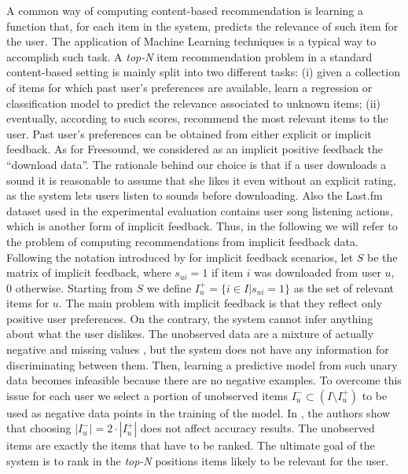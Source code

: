 A common way of computing content-based recommendation is learning a function that, for each item in the system, predicts the relevance of such item for the user. 
The application of Machine Learning techniques is a typical way to accomplish such task. %
A \textit{top-N}\xspace item recommendation problem in a standard content-based setting is mainly split into two different tasks: 
(i) given a collection of items for which past user's preferences are available, learn a regression or classification model to predict the relevance associated to unknown items; (ii) eventually, according to such scores, recommend the most relevant items to the user. 
Past user's preferences can be obtained from either explicit or implicit feedback. As for Freesound, we considered as an implicit positive feedback the ``download data''. The rationale behind our choice is that if a user downloads a sound it is reasonable to assume that she likes it even without an explicit rating, as the system lets users listen to sounds before downloading. Also the Last.fm dataset used in the experimental evaluation contains user song listening actions, which is another form of implicit feedback. 
Thus, in the following we will refer to the problem of computing recommendations from implicit feedback data. 
Following the notation introduced by \cite{RendleFGS09} for implicit feedback scenarios, let $S$  be the matrix of implicit feedback, where $s_{ui}=1$ if item $i$ was downloaded from user $u$, 0 otherwise. 
Starting from $S$ we define $I_u^+ = \lbrace i \in I |  s_{ui}=1\rbrace$ as the set of relevant items for $u$. 
The main problem with implicit feedback is that they reflect only positive user preferences. On the contrary, the system cannot infer anything about what the user dislikes. The unobserved data are a mixture of actually negative and missing values \citep{RendleFGS09}, but the system does not have any information for discriminating between them. 
Then, learning a predictive model from such unary data becomes infeasible because there are no negative examples. To overcome this issue for each user we select a portion of unobserved items $I_u^- \subset (I \setminus I_u^+)$ to be used as negative data points in the training of the model. In \cite{Ostuni2013}, the authors show that choosing $|I_u^-| = 2\cdot |I_u^+|$ does not affect accuracy results.
The unobserved items are exactly the items that have to be ranked. The ultimate goal of the system is to rank in the \textit{top-N}\xspace positions items likely to be relevant for the user. 

